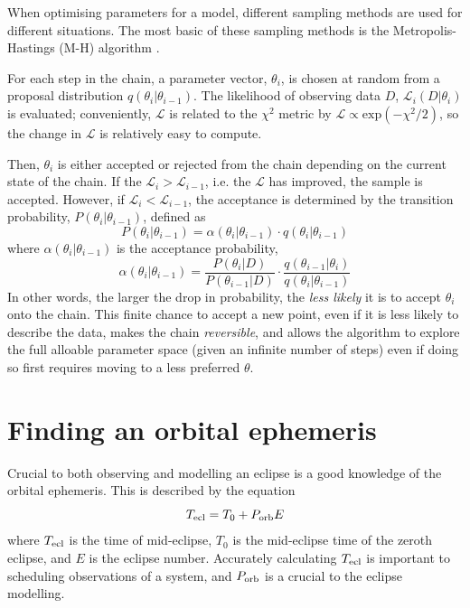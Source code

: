 When optimising parameters for a model, different sampling methods are used for different situations. 
The most basic of these sampling methods is the Metropolis-Hastings (M-H) algorithm \citep{metropolis1953,hastings1970}. 

For each step in the chain, a parameter vector, $\theta_i$, is chosen at random from a proposal distribution $q(\theta_i | \theta_{i-1})$. The likelihood of observing data $D$, $\mathcal{L}_i(D | \theta_i)$ is evaluated; conveniently, $\mathcal{L}$ is related to the $\chi^2$ metric by $\mathcal{L} \propto \mathrm{exp}(-\chi^2/2)$, so the change in $\mathcal{L}$ is relatively easy to compute.

Then, $\theta_i$ is either accepted or rejected from the chain depending on the current state of the chain. If the $\mathcal{L}_i > \mathcal{L}_{i-1}$, i.e. the $\mathcal{L}$ has improved, the sample is accepted. However, if $\mathcal{L}_i < \mathcal{L}_{i-1}$, the acceptance is determined by the transition probability, $P(\theta_i | \theta_{i-1})$, defined as 
\begin{equation}
    P(\theta_i | \theta_{i-1}) = \alpha(\theta_i | \theta_{i-1}) \cdot q(\theta_i | \theta_{i-1})
\end{equation}
where $\alpha(\theta_i | \theta_{i-1})$ is the acceptance probability, 
\begin{equation}
    \alpha(\theta_i | \theta_{i-1}) = \frac{P(\theta_i | D)} {P(\theta_{i-1} | D)} \cdot \frac{q(\theta_{i-1} | \theta_i)} {q (\theta_i | \theta_{i-1})}
\end{equation}
In other words, the larger the drop in probability, the \textit{less likely} it is to accept $\theta_i$ onto the chain. This finite chance to accept a new point, even if it is less likely to describe the data, makes the chain \textit{reversible}, and allows the algorithm to explore the full alloable parameter space (given an infinite number of steps) even if doing so first requires moving to a less preferred $\theta$. 


\section{Finding an orbital ephemeris}
\label{sect:modelling:getting ephemeris}

Crucial to both observing and modelling an eclipse is a good knowledge of the orbital ephemeris. This is described by the equation
\begin{equation}
    \label{eqn:modelling:general ephemeris equation}
    T_{\rm ecl} = T_0 + P_{\rm orb} E
\end{equation}
where $T_{\rm ecl}$ is the time of mid-eclipse, $T_0$ is the mid-eclipse time of the zeroth eclipse, and $E$ is the eclipse number. Accurately calculating $T_{\rm ecl}$ is important to scheduling observations of a system, and $P_{\rm orb}$ is a crucial to the eclipse modelling. 


